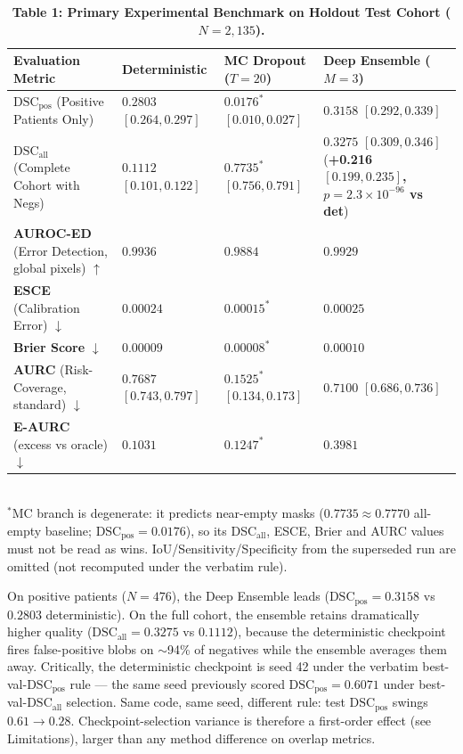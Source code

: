 \documentclass[11pt,a4paper]{article}
\begin{document}
\begin{table}[t]
\centering
\small
\caption{\textbf{Table 1: Primary Experimental Benchmark on Holdout Test Cohort ($N=2,135$).}}
\label{tab:benchmark}
\begin{tabularx}{\linewidth}{l X X X}
\toprule
\textbf{Evaluation Metric} & \textbf{Deterministic} & \textbf{MC Dropout ($T=20$)} & \textbf{Deep Ensemble ($M=3$)} \\
\midrule
$\text{DSC}_{\text{pos}}$ (Positive Patients Only) & $0.2803$ $[0.264, 0.297]$ & $0.0176^*$ $[0.010, 0.027]$ & $\mathbf{0.3158}$ $[0.292, 0.339]$ \\
$\text{DSC}_{\text{all}}$ (Complete Cohort with Negs) & $0.1112$ $[0.101, 0.122]$ & $0.7735^*$ $[0.756, 0.791]$ & $\mathbf{0.3275}$ $[0.309, 0.346]$ (\textbf{+0.216 $[0.199, 0.235]$, $p = 2.3 \times 10^{-96}$ vs det}) \\
\midrule
\textbf{AUROC-ED} (Error Detection, global pixels) $\uparrow$ & $\mathbf{0.9936}$ & $0.9884$ & $0.9929$ \\
\textbf{ESCE} (Calibration Error) $\downarrow$ & $0.00024$ & $0.00015^*$ & $\mathbf{0.00025}$ \\
\textbf{Brier Score} $\downarrow$ & $0.00009$ & $0.00008^*$ & $0.00010$ \\
\textbf{AURC} (Risk-Coverage, standard) $\downarrow$ & $0.7687$ $[0.743, 0.797]$ & $0.1525^*$ $[0.134, 0.173]$ & $\mathbf{0.7100}$ $[0.686, 0.736]$ \\
\textbf{E-AURC} (excess vs oracle) $\downarrow$ & $\mathbf{0.1031}$ & $0.1247^*$ & $0.3981$ \\
\bottomrule
\end{tabularx}
\\[2pt]
{\footnotesize $^*$MC branch is degenerate: it predicts near-empty masks ($0.7735 \approx 0.7770$ all-empty baseline; $\text{DSC}_{\text{pos}} = 0.0176$), so its DSC$_{\text{all}}$, ESCE, Brier and AURC values must not be read as wins. IoU/Sensitivity/Specificity from the superseded run are omitted (not recomputed under the verbatim rule).}
\end{table}

On positive patients ($N=476$), the Deep Ensemble leads ($\text{DSC}_{\text{pos}} = 0.3158$ vs $0.2803$ deterministic). On the full cohort, the ensemble retains dramatically higher quality ($\text{DSC}_{\text{all}} = 0.3275$ vs $0.1112$), because the deterministic checkpoint fires false-positive blobs on $\sim$94\% of negatives while the ensemble averages them away.
Critically, the deterministic checkpoint is seed 42 under the verbatim best-val-$\text{DSC}_{\text{pos}}$ rule — the same seed previously scored $\text{DSC}_{\text{pos}} = 0.6071$ under best-val-$\text{DSC}_{\text{all}}$ selection. Same code, same seed, different rule: test $\text{DSC}_{\text{pos}}$ swings $0.61 \to 0.28$. Checkpoint-selection variance is therefore a first-order effect (see Limitations), larger than any method difference on overlap metrics.
\end{document}
